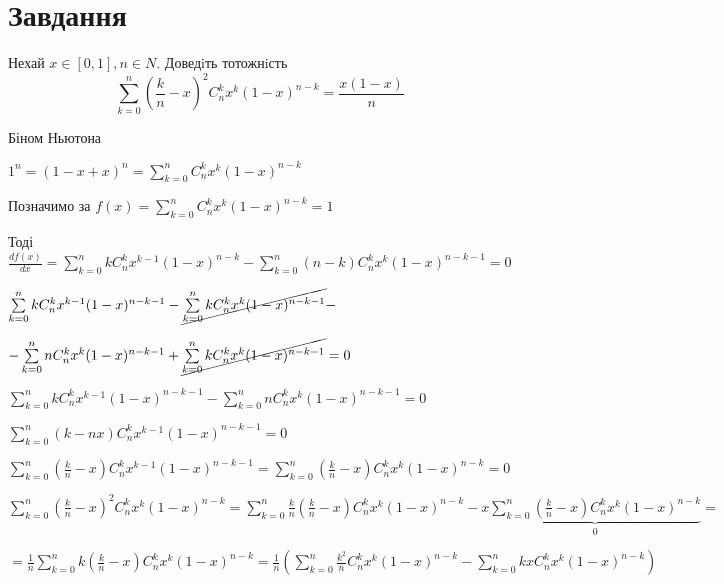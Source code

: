 
\chapter{Завдання \theHchapter}

\begin{tcolorbox}[title=Завдання]
    Нехай $x \in [0, 1], n \in N$. Доведiть тотожнiсть
    $$ \sum\limits_{k=0}^{n}(\frac{k}{n} - x)^2 C_n^kx^k(1-x)^{n-k}=
    \frac{x(1-x)}{n} $$
\end{tcolorbox}



Біном Ньютона


$ 1^n = (1 - x + x)^n = \sum\limits_{k=0}^{n}C_n^kx^k(1 - x)^{n - k} $


Позначимо за $f(x) = \sum\limits_{k=0}^{n}C_n^kx^k(1 - x)^{n - k} = 1$


Тоді $\frac{df(x)}{dx} = 
\sum\limits_{k=0}^{n}kC_n^kx^{k-1}(1 - x)^{n - k} - 
\sum\limits_{k=0}^{n}(n - k)C_n^kx^k(1 - x)^{n - k - 1} = 0$


$ 
\sum\limits_{k=0}^{n}kC_n^kx^{k-1}(1 - x)^{n - k - 1} -
\cancel{\sum\limits_{k=0}^{n}kC_n^kx^{k}(1 - x)^{n - k - 1}} -$


$-\sum\limits_{k=0}^{n}nC_n^kx^k(1 - x)^{n - k - 1} + 
\cancel{\sum\limits_{k=0}^{n}kC_n^kx^k(1 - x)^{n - k - 1}} = 0$


$
\sum\limits_{k=0}^{n}kC_n^kx^{k-1}(1 - x)^{n - k - 1} -
\sum\limits_{k=0}^{n}nC_n^kx^k(1 - x)^{n - k - 1} = 0$ 


$\sum\limits_{k=0}^{n}(k - nx)C_n^kx^{k-1}(1 - x)^{n - k - 1} = 0  $



$\sum\limits_{k=0}^{n}(\frac{k}{n} - x)
C_n^kx^{k-1}(1 - x)^{n - k - 1} =  
\sum\limits_{k=0}^{n}(\frac{k}{n} - x)
C_n^kx^{k}(1 - x)^{n - k} = 0  $


$ \sum\limits_{k=0}^{n}(\frac{k}{n} - x)^2 C_n^kx^k(1-x)^{n-k} = 
\sum\limits_{k=0}^{n}\frac{k}{n}(\frac{k}{n} - x) C_n^kx^k(1-x)^{n-k} - 
x\underbrace{\sum\limits_{k=0}^{n}(\frac{k}{n} - x) C_n^kx^k(1-x)^{n-k}}_{\mbox{0}} = $


$=\frac{1}{n}\sum\limits_{k=0}^{n}k(\frac{k}{n} - x) C_n^kx^k(1-x)^{n-k} = 
\frac{1}{n}(\sum\limits_{k=0}^{n}\frac{k^2}{n} C_n^kx^k(1-x)^{n-k} - 
\sum\limits_{k=0}^{n}kxC_n^kx^k(1-x)^{n-k})$
